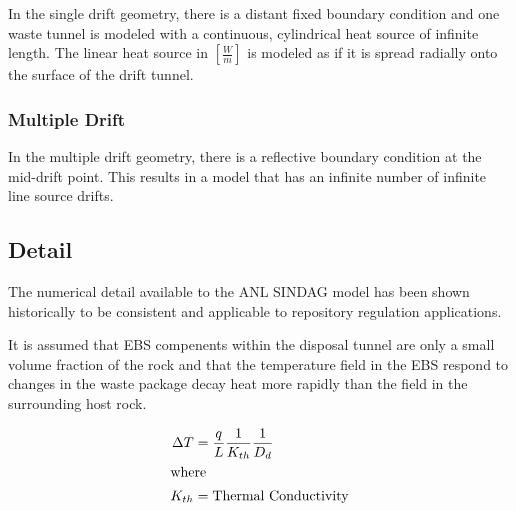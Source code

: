 \documentclass{anstrans}
\begin{document}
In the single drift geometry, there is a distant fixed boundary condition and 
one waste tunnel is modeled with a continuous, cylindrical heat source of 
infinite length. The linear heat source in $[\frac{W}{m}]$ is modeled as if it 
is spread radially onto the surface of the drift tunnel. 

\subsubsection{Multiple Drift}

In the multiple drift geometry, there is a reflective boundary condition at the 
mid-drift point. This results in a model that has an infinite number of infinite 
line source drifts.

\subsection{Detail}

The numerical detail available to the \gls{ANL} \gls{SINDAG} model has been 
shown historically to be consistent and applicable to repository regulation 
applications.













It is assumed that \gls{EBS} compenents within the disposal tunnel are only a 
small volume fraction of the rock and that the temperature field in the \gls{EBS} 
respond to changes in the waste package decay heat more rapidly than the field 
in the surrounding host rock.

\begin{align}
  \Delta T &= \frac{q}{L} \frac{1}{K_{th}}\frac{1}{D_d}\\
  \intertext{where}
  K_{th} &= \mbox{Thermal Conductivity}
  \label{deltat}
\end{align}



\end{document}
